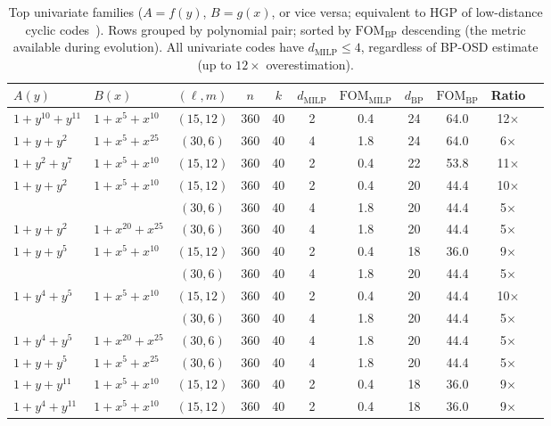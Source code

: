 \documentclass[aps,prxquantum,twocolumn,superscriptaddress,nofootinbib]{revtex4-2}
\newcommand{\FOM}{\ensuremath{\mathrm{FOM}}}
\begin{document}
\begin{table}[t]
\centering
\caption{Top univariate families ($A = f(y)$, $B = g(x)$, or vice versa; equivalent to HGP of low-distance cyclic codes~\cite{eberhardt2024pruning}).
Rows grouped by polynomial pair; sorted by $\FOM_{\text{BP}}$ descending (the metric available during evolution).
All univariate codes have $d_{\text{MILP}} \leq 4$, regardless of BP-OSD estimate (up to $12\times$ overestimation).}
\label{tab:uv_families}
\begin{tabular}{llccccccccc}
\toprule
$A(y)$ & $B(x)$ & $(\ell,m)$ & $n$ & $k$ & $d_{\text{MILP}}$ & $\FOM_{\text{MILP}}$ & $d_{\text{BP}}$ & $\FOM_{\text{BP}}$ & Ratio \\
\midrule
$1{+}y^{10}{+}y^{11}$ & $1{+}x^{5}{+}x^{10}$ & $(15,12)$ & 360 & 40 & 2 & 0.4 & 24 & 64.0 & 12$\times$ \\
\midrule
$1{+}y{+}y^{2}$ & $1{+}x^{5}{+}x^{25}$ & $(30,6)$ & 360 & 40 & 4 & 1.8 & 24 & 64.0 & 6$\times$ \\
\midrule
$1{+}y^{2}{+}y^{7}$ & $1{+}x^{5}{+}x^{10}$ & $(15,12)$ & 360 & 40 & 2 & 0.4 & 22 & 53.8 & 11$\times$ \\
\midrule
$1{+}y{+}y^{2}$ & $1{+}x^{5}{+}x^{10}$ & $(15,12)$ & 360 & 40 & 2 & 0.4 & 20 & 44.4 & 10$\times$ \\
 & & $(30,6)$ & 360 & 40 & 4 & 1.8 & 20 & 44.4 & 5$\times$ \\
\midrule
$1{+}y{+}y^{2}$ & $1{+}x^{20}{+}x^{25}$ & $(30,6)$ & 360 & 40 & 4 & 1.8 & 20 & 44.4 & 5$\times$ \\
\midrule
$1{+}y{+}y^{5}$ & $1{+}x^{5}{+}x^{10}$ & $(15,12)$ & 360 & 40 & 2 & 0.4 & 18 & 36.0 & 9$\times$ \\
 & & $(30,6)$ & 360 & 40 & 4 & 1.8 & 20 & 44.4 & 5$\times$ \\
\midrule
$1{+}y^{4}{+}y^{5}$ & $1{+}x^{5}{+}x^{10}$ & $(15,12)$ & 360 & 40 & 2 & 0.4 & 20 & 44.4 & 10$\times$ \\
 & & $(30,6)$ & 360 & 40 & 4 & 1.8 & 20 & 44.4 & 5$\times$ \\
\midrule
$1{+}y^{4}{+}y^{5}$ & $1{+}x^{20}{+}x^{25}$ & $(30,6)$ & 360 & 40 & 4 & 1.8 & 20 & 44.4 & 5$\times$ \\
\midrule
$1{+}y{+}y^{5}$ & $1{+}x^{5}{+}x^{25}$ & $(30,6)$ & 360 & 40 & 4 & 1.8 & 20 & 44.4 & 5$\times$ \\
\midrule
$1{+}y{+}y^{11}$ & $1{+}x^{5}{+}x^{10}$ & $(15,12)$ & 360 & 40 & 2 & 0.4 & 18 & 36.0 & 9$\times$ \\
\midrule
$1{+}y^{4}{+}y^{11}$ & $1{+}x^{5}{+}x^{10}$ & $(15,12)$ & 360 & 40 & 2 & 0.4 & 18 & 36.0 & 9$\times$ \\

\end{tabular}
\end{table}
\end{document}
